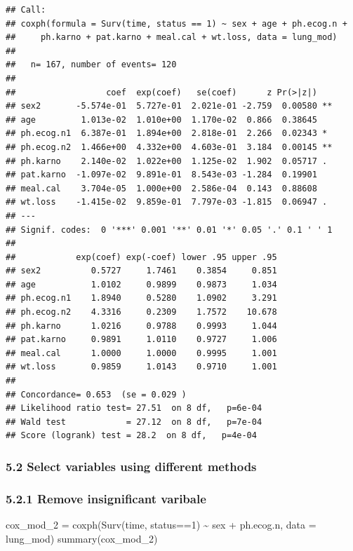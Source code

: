\documentclass[
]{article}
\newenvironment{Shaded}{\begin{snugshade}}{\end{snugshade}}
\newcommand{\AttributeTok}[1]{\textcolor[rgb]{0.77,0.63,0.00}{#1}}
\newcommand{\DecValTok}[1]{\textcolor[rgb]{0.00,0.00,0.81}{#1}}
\newcommand{\FunctionTok}[1]{\textcolor[rgb]{0.00,0.00,0.00}{#1}}
\newcommand{\NormalTok}[1]{#1}
\newcommand{\OtherTok}[1]{\textcolor[rgb]{0.56,0.35,0.01}{#1}}
\newcommand{\SpecialCharTok}[1]{\textcolor[rgb]{0.00,0.00,0.00}{#1}}
\begin{document}
\begin{verbatim}
## Call:
## coxph(formula = Surv(time, status == 1) ~ sex + age + ph.ecog.n + 
##     ph.karno + pat.karno + meal.cal + wt.loss, data = lung_mod)
## 
##   n= 167, number of events= 120 
## 
##                  coef  exp(coef)   se(coef)      z Pr(>|z|)   
## sex2       -5.574e-01  5.727e-01  2.021e-01 -2.759  0.00580 **
## age         1.013e-02  1.010e+00  1.170e-02  0.866  0.38645   
## ph.ecog.n1  6.387e-01  1.894e+00  2.818e-01  2.266  0.02343 * 
## ph.ecog.n2  1.466e+00  4.332e+00  4.603e-01  3.184  0.00145 **
## ph.karno    2.140e-02  1.022e+00  1.125e-02  1.902  0.05717 . 
## pat.karno  -1.097e-02  9.891e-01  8.543e-03 -1.284  0.19901   
## meal.cal    3.704e-05  1.000e+00  2.586e-04  0.143  0.88608   
## wt.loss    -1.415e-02  9.859e-01  7.797e-03 -1.815  0.06947 . 
## ---
## Signif. codes:  0 '***' 0.001 '**' 0.01 '*' 0.05 '.' 0.1 ' ' 1
## 
##            exp(coef) exp(-coef) lower .95 upper .95
## sex2          0.5727     1.7461    0.3854     0.851
## age           1.0102     0.9899    0.9873     1.034
## ph.ecog.n1    1.8940     0.5280    1.0902     3.291
## ph.ecog.n2    4.3316     0.2309    1.7572    10.678
## ph.karno      1.0216     0.9788    0.9993     1.044
## pat.karno     0.9891     1.0110    0.9727     1.006
## meal.cal      1.0000     1.0000    0.9995     1.001
## wt.loss       0.9859     1.0143    0.9710     1.001
## 
## Concordance= 0.653  (se = 0.029 )
## Likelihood ratio test= 27.51  on 8 df,   p=6e-04
## Wald test            = 27.12  on 8 df,   p=7e-04
## Score (logrank) test = 28.2  on 8 df,   p=4e-04
\end{verbatim}

\hypertarget{select-variables-using-different-methods}{%
\subsubsection{5.2 Select variables using different
methods}\label{select-variables-using-different-methods}}

\hypertarget{remove-insignificant-varibale}{%
\subsubsection{5.2.1 Remove insignificant
varibale}\label{remove-insignificant-varibale}}

\begin{Shaded}
\begin{Highlighting}[]
\NormalTok{cox\_mod\_2 }\OtherTok{=} \FunctionTok{coxph}\NormalTok{(}\FunctionTok{Surv}\NormalTok{(time, status}\SpecialCharTok{==}\DecValTok{1}\NormalTok{) }\SpecialCharTok{\textasciitilde{}}\NormalTok{ sex }\SpecialCharTok{+}\NormalTok{ ph.ecog.n, }\AttributeTok{data =}\NormalTok{ lung\_mod)}
\FunctionTok{summary}\NormalTok{(cox\_mod\_2)}
\end{Highlighting}
\end{Shaded}
\end{document}
